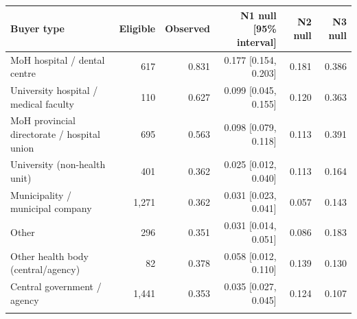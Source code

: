 \begin{tabular}{@{}lrrrrr@{}}
\toprule
Buyer type & Eligible & Observed & N1 null [95\% interval] & N2 null & N3 null\\
\midrule
MoH hospital / dental centre & 617 & 0.831 & 0.177 [0.154, 0.203] & 0.181 & 0.386\\
University hospital / medical faculty & 110 & 0.627 & 0.099 [0.045, 0.155] & 0.120 & 0.363\\
MoH provincial directorate / hospital union & 695 & 0.563 & 0.098 [0.079, 0.118] & 0.113 & 0.391\\
University (non-health unit) & 401 & 0.362 & 0.025 [0.012, 0.040] & 0.113 & 0.164\\
Municipality / municipal company & 1,271 & 0.362 & 0.031 [0.023, 0.041] & 0.057 & 0.143\\
Other & 296 & 0.351 & 0.031 [0.014, 0.051] & 0.086 & 0.183\\
Other health body (central/agency) & 82 & 0.378 & 0.058 [0.012, 0.110] & 0.139 & 0.130\\
Central government / agency & 1,441 & 0.353 & 0.035 [0.027, 0.045] & 0.124 & 0.107\\
\botrule
\end{tabular}